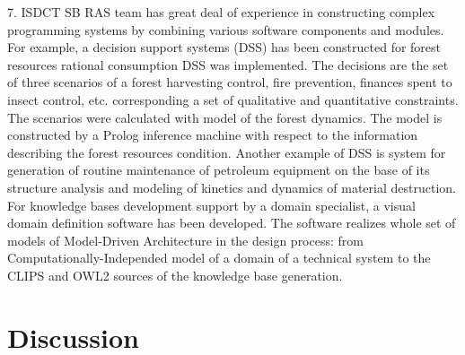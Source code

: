 \documentclass[runningheads]{llncs}
\begin{document}
7. ISDCT SB RAS team has great deal of experience in constructing complex programming systems by combining various software components and modules. For example, a decision support systems (DSS) has been constructed for forest resources rational consumption DSS was implemented. The decisions are the set of three scenarios of a forest harvesting control, fire prevention, finances spent to insect control, etc. corresponding a set of qualitative and quantitative constraints. The scenarios were calculated with model of the forest dynamics. The model is constructed by a Prolog inference machine with respect to the information describing the forest resources condition. Another example of DSS is system for generation of routine maintenance of petroleum equipment on the base of its structure analysis and modeling of kinetics and dynamics of material destruction.
For knowledge bases development support by a domain specialist, a visual domain definition software has been developed. The software realizes whole set of models of Model-Driven Architecture in the design process: from Computationally-Independed model of a domain of a technical system to the CLIPS and OWL2 sources of the knowledge base generation.


\section{Discussion}
\label{sec:disc}
\end{document}
